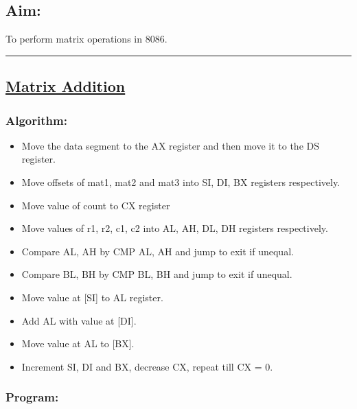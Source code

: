 \documentclass[10pt,a4paper]{article}
\begin{document}
\begin{flushleft}
\subsection*{\textbf{Aim:}} 
To perform matrix operations in 8086.

\vspace{1cm}
\hrule
\subsection*{\textbf{\underline{Matrix Addition}}}

\subsubsection*{\textbf{Algorithm:}}
\begin{itemize}
    \item Move the data segment to the AX register and then move it to the DS register.
    \item Move offsets of mat1, mat2 and mat3 into SI, DI, BX registers respectively.
    \item Move value of count to CX register
    \item Move values of r1, r2, c1, c2 into AL, AH, DL, DH registers respectively. 
    \item Compare AL, AH by CMP AL, AH and jump to exit if unequal.
    \item Compare BL, BH by CMP BL, BH and jump to exit if unequal.
    \item Move value at [SI] to AL register.
    \item Add AL with value at [DI].
    \item Move value at AL to [BX].
    \item Increment SI, DI and BX, decrease CX, repeat till CX = 0.
\end{itemize}

\newpage
\subsubsection*{\textbf{Program:}}


\end{flushleft}
\end{document}
